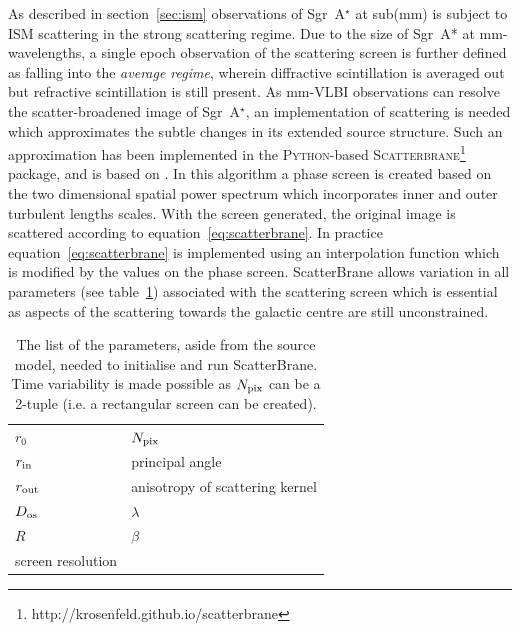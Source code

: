 As described in section~\ref{sec:ism} observations of Sgr~A$^\star$ at sub(mm) is subject to ISM scattering in the strong scattering regime. Due to the size of Sgr~A* at mm-wavelengths, a single epoch observation of the scattering screen is further defined as falling into the \emph{average regime}, wherein diffractive scintillation is averaged out but refractive scintillation is still present. As mm-VLBI observations can resolve the scatter-broadened image of Sgr~A$^\star$, an implementation of scattering is needed which approximates the subtle changes in its extended source structure. Such an approximation has been implemented in the \textsc{Python}-based \textsc{Scatterbrane}\footnote{http://krosenfeld.github.io/scatterbrane} package, and is based on \citet*{Johnson_2015a}. In this algorithm a phase screen is created based on the two dimensional spatial power spectrum  \citep*[see][Appendix C]{Johnson_2015a} which incorporates inner and outer turbulent lengths scales. With the screen generated, the original image is scattered according to equation~\ref{eq:scatterbrane}. In practice equation~\ref{eq:scatterbrane} is implemented using an interpolation function which is modified by the values on the phase screen. {\sc ScatterBrane} allows variation in all parameters (see table~\ref{tab:parm_ism}) associated with the scattering screen which is essential as aspects of the scattering towards the galactic centre are still unconstrained.

\begin{table}\label{tab:parm_ism}
\centering
\caption{The list of the parameters, aside from the source model, needed to initialise and run {\sc ScatterBrane}. Time variability is made possible as $N_{\rm pix}$ can be a 2-tuple (i.e. a rectangular screen can be created).
}
\begin{tabular}{ll}
$r_0$            & $N_{\rm pix}$ \\
$r_{\rm in}$     & principal angle             \\
$r_{\rm out}$    & anisotropy of scattering kernel    \\
$D_{\rm os}$     & $\lambda$        \\
$R$              & $\beta$          \\
screen resolution &               
\end{tabular}
\end{table}



